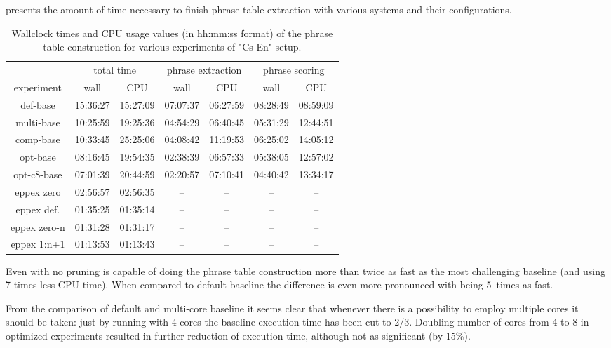  presents the amount of time necessary to finish
phrase table extraction with various systems and their configurations.

\begin{table}[ht]
\centering
\begin{tabular}{ | c | c c | c c | c c | }
\hline
 & \multicolumn{2}{|c|}{total time} & \multicolumn{2}{|c|}{phrase extraction} & \multicolumn{2}{|c|}{phrase scoring} \\
experiment & wall & CPU & wall & CPU & wall & CPU \\
\hline
\hline
def-base      & 15:36:27 & 15:27:09 & 07:07:37 & 06:27:59 & 08:28:49 & 08:59:09 \\
multi-base    & 10:25:59 & 19:25:36 & 04:54:29 & 06:40:45 & 05:31:29 & 12:44:51 \\
comp-base     & 10:33:45 & 25:25:06 & 04:08:42 & 11:19:53 & 06:25:02 & 14:05:12 \\
opt-base      & 08:16:45 & 19:54:35 & 02:38:39 & 06:57:33 & 05:38:05 & 12:57:02 \\
opt-c8-base   & 07:01:39 & 20:44:59 & 02:20:57 & 07:10:41 & 04:40:42 & 13:34:17 \\
eppex zero    & 02:56:57 & 02:56:35 &       -- &       -- &       -- &       -- \\
\hline
eppex def.    & 01:35:25 & 01:35:14 &       -- &       -- &       -- &       -- \\
eppex zero-n  & 01:31:28 & 01:31:17 &       -- &       -- &       -- &       -- \\
eppex 1:n+1   & 01:13:53 & 01:13:43 &       -- &       -- &       -- &       -- \\
\hline
\end{tabular}
\caption{\label{cs-en-wmt13-time-benchmarks}
Wallclock times and CPU usage values (in hh:mm:ss format) of the phrase table
construction for various experiments of "Cs-En" setup.}
\end{table}

Even with no pruning \eppex{} is capable of doing the phrase table construction more
than twice as fast as the most challenging baseline (and using 7 times less CPU time).
When compared to default baseline the difference is even more pronounced with \eppex{}
being 5~times as fast.

From the comparison of default and multi-core baseline it seems clear that whenever there
is a possibility to employ multiple cores it should be taken: just by running with 4 cores
the baseline execution time has been cut to $2/3$.
Doubling number of cores from 4 to 8 in optimized experiments resulted in further reduction
of execution time, although not as significant (by 15\%).

